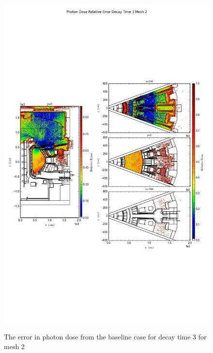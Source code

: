 \begin{figure}[ht!]
\centering
\includegraphics[trim={0cm 9cm 0cm 10cm},clip,scale=0.75]{../plots/final_model/Photon_Dose_Relative_Error_Decay_Time_3_Mesh_2.png}
\label{fig:photons_dc3_no4bc_m2_error}
\caption{The error in photon dose from the baseline case for decay time 3 for mesh 2}
\end{figure}
